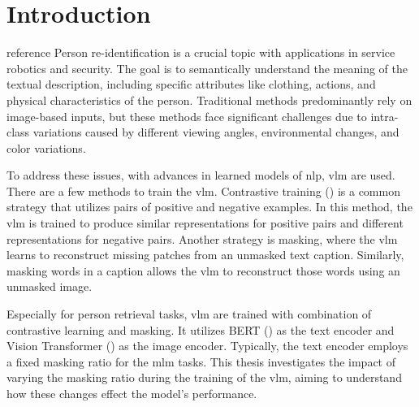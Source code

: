 \chapter{Introduction}
{\color{red} reference}
Person re-identification is a crucial topic with applications in service robotics and security. The goal is to semantically understand the meaning of the textual description, including specific attributes like clothing, actions, and physical characteristics of the person. Traditional methods predominantly rely on image-based inputs, but these methods face significant challenges due to intra-class variations caused by different viewing angles, environmental changes, and color variations.

To address these issues, with advances in learned models of \acrfull{nlp}, \acrfull{vlm} are used. There are a few methods to train the \acrshort{vlm}. 
Contrastive training (\cite{khosla2021supervisedcontrastivelearning}) is a common strategy that utilizes pairs of positive and negative examples. In this method, the \acrshort{vlm} is trained to produce similar representations for positive pairs and different representations for negative pairs. Another strategy is masking, where the \acrshort{vlm} learns to reconstruct missing patches from an unmasked text caption. Similarly, masking words in a caption allows the \acrshort{vlm} to reconstruct those words using an unmasked image.


Especially for person retrieval tasks, \acrshort{vlm} are trained with combination of contrastive learning and masking. It utilizes BERT (\cite{devlin2018bert}) as the text encoder and Vision Transformer (\cite{dosovitskiy2021image}) as the image encoder. Typically, the text encoder employs a fixed masking ratio for the \acrfull{mlm} tasks. This thesis investigates the impact of varying the masking ratio during the training of the \acrshort{vlm}, aiming to understand how these changes effect the model's performance.

